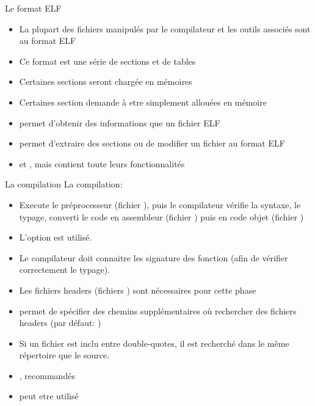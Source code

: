 \begin{frame}[fragile=singleslide]{Le format ELF}
  \begin{itemize}
  \item La  plupart des fichiers  manipulés par le compilateur  et les
    outils associés sont au format ELF
  \item Ce format est une série de sections et de tables
  \item  Certaines sections seront chargée en mémoires
  \item  Certaines  section  demande  à etre  simplement  allouées  en
    mémoire
  \item  {} permet  d'obtenir des  informations  que un
    fichier ELF
  \item  {}  permet   d'extraire  des  sections  ou  de
    modifier un fichier au format ELF
  \item {}  et , mais   contient
    toute leurs fonctionnalités
  \end{itemize}
\end{frame}

\begin{frame}[fragile=singleslide]{La compilation}
  La compilation:
  \begin{itemize}
  \item Execute le préprocesseur (fichier ), puis le compilateur
    vérifie  la syntaxe,  le typage,  converti le  code  en assembleur
    (fichier ) puis en code objet (fichier )
  \item L'option  est utilisé.
  \item Le compilateur doit connaitre les signature des fonction (afin
    de vérifier correctement le typage).
  \item Les  fichiers headers  (fichiers ) sont  nécessaires pour
    cette phase
  \item  {} permet  de  spécifier des  chemins supplémentaires  où
    rechercher des fichiers headers (par défaut: )
  \item Si un fichier est  inclu entre double-quotes, il est recherché
    dans le même répertoire que le source.
  \item {},  recommandés
  \item {} peut etre utilisé
  \end{itemize}
\end{frame}

